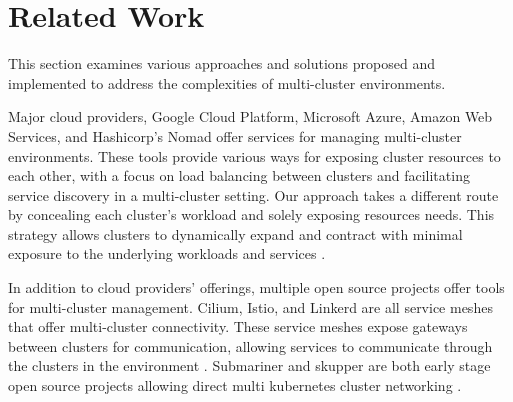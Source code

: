 
\chapter{Related Work}

%
%
%
%
%
%
%
%
%
%
%
%
This section examines various approaches and solutions proposed and implemented
to address the complexities of multi-cluster environments.

Major cloud providers, Google Cloud Platform, Microsoft Azure, Amazon Web
Services, and Hashicorp's Nomad offer services for managing multi-cluster
environments. These tools provide various ways for exposing cluster resources
to each other, with a focus on load balancing between clusters and facilitating
service discovery in a multi-cluster setting. Our approach takes a different
route by concealing each cluster's workload and solely exposing resources
needs. This strategy allows clusters to dynamically expand and contract with
minimal exposure to the underlying workloads and services
\cite{noauthor_fleet_nodate, noauthor_azure_nodate,
noauthor_multi-region_nodate}.

In addition to cloud providers' offerings, multiple open source projects offer
tools for multi-cluster management. Cilium, Istio, and Linkerd are all service
meshes that offer multi-cluster connectivity. These service meshes expose
gateways between clusters for communication, allowing services to communicate
through the clusters in the environment \cite{noauthor_cluster_nodate,
noauthor_multi-cluster_nodate-2, noauthor_install_nodate}. Submariner and
skupper are both early stage open source projects allowing direct multi
kubernetes cluster networking \cite{noauthor__nodate, noauthor_skupper_nodate}. 

